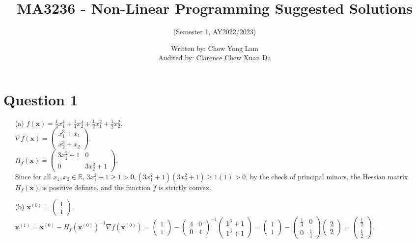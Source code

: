 \documentclass{article}
\title{MA3236 - Non-Linear Programming Suggested Solutions}
\author{(Semester 1, AY2022/2023)}
\date{Written by: Chow Yong Lam\\ Audited by: Clarence Chew Xuan Da}
\begin{document}
\maketitle

\section*{Question 1}
\begin{itemize}
    \item[(a)] $f(\mathbf{x}) = \frac14x_1^4+\frac14x_2^4+\frac12x_1^2+\frac12x_2^2$.\\
    $\nabla f(\mathbf{x}) = \begin{pmatrix}x_1^3+x_1\\x_2^3+x_2\end{pmatrix}$.\\
    $H_f(\mathbf{x}) = \begin{pmatrix}3x_1^2+1&0\\0&3x_2^2+1\end{pmatrix}$.\\
    Since for all $x_1, x_2\in\mathbb{R}$, $3x_1^2+1\geq1>0, (3x_1^2+1)(3x_2^2+1)\geq 1(1)>0$, by the check of principal minors, the Hessian matrix $H_f(\mathbf{x})$ is positive definite, and the function $f$ is strictly convex.
   \item[(b)] $\mathbf{x}^{(0)}=\begin{pmatrix}1\\1\end{pmatrix}$. \\
   $\mathbf{x}^{(1)}=\mathbf{x}^{(0)} - H_f(\mathbf{x}^{(0)})^{-1}\nabla f(\mathbf{x}^{(0)}) = \begin{pmatrix}1\\1\end{pmatrix} - \begin{pmatrix} 4&0\\0&4\end{pmatrix}^{-1}\begin{pmatrix}1^3+1\\1^3+1\end{pmatrix}= \begin{pmatrix}1\\1\end{pmatrix} - \begin{pmatrix} \frac14&0\\0&\frac14\end{pmatrix}\begin{pmatrix}2\\2\end{pmatrix}=\begin{pmatrix}\frac12\\\frac12\end{pmatrix}$. \\

\end{itemize}
\end{document}
